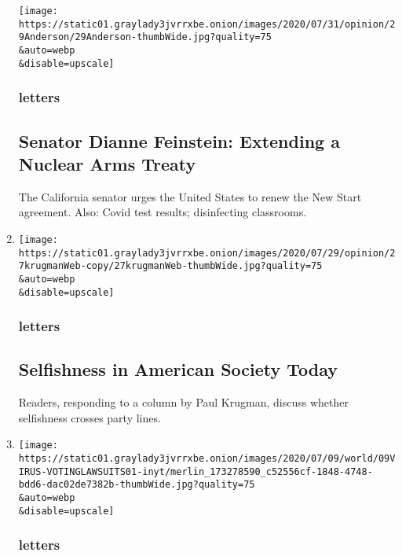 \begin{enumerate}
  \texttt{[image: https://static01.graylady3jvrrxbe.onion/images/2020/07/31/opinion/29Anderson/29Anderson-thumbWide.jpg?quality=75\\\&auto=webp\\\&disable=upscale]}

  \hypertarget{letters-2}{%
  \subsubsection{letters}\label{letters-2}}

  \hypertarget{senator-dianne-feinstein-extending-a-nuclear-arms-treaty}{%
  \subsection{Senator Dianne Feinstein: Extending a Nuclear Arms
  Treaty}\label{senator-dianne-feinstein-extending-a-nuclear-arms-treaty}}

  The California senator urges the United States to renew the New Start
  agreement. Also: Covid test results; disinfecting classrooms.
\item
  \href{/2020/08/03/opinion/letters/selfishness-society.html}{}

  \texttt{[image: https://static01.graylady3jvrrxbe.onion/images/2020/07/29/opinion/27krugmanWeb-copy/27krugmanWeb-thumbWide.jpg?quality=75\\\&auto=webp\\\&disable=upscale]}

  \hypertarget{letters-3}{%
  \subsubsection{letters}\label{letters-3}}

  \hypertarget{selfishness-in-american-society-today}{%
  \subsection{Selfishness in American Society
  Today}\label{selfishness-in-american-society-today}}

  Readers, responding to a column by Paul Krugman, discuss whether
  selfishness crosses party lines.
\item
  \href{/2020/08/02/opinion/letters/voting-election.html}{}

  \texttt{[image: https://static01.graylady3jvrrxbe.onion/images/2020/07/09/world/09VIRUS-VOTINGLAWSUITS01-inyt/merlin\_173278590\_c52556cf-1848-4748-bdd6-dac02de7382b-thumbWide.jpg?quality=75\\\&auto=webp\\\&disable=upscale]}

  \hypertarget{letters-4}{%
  \subsubsection{letters}\label{letters-4}}


\end{enumerate}
